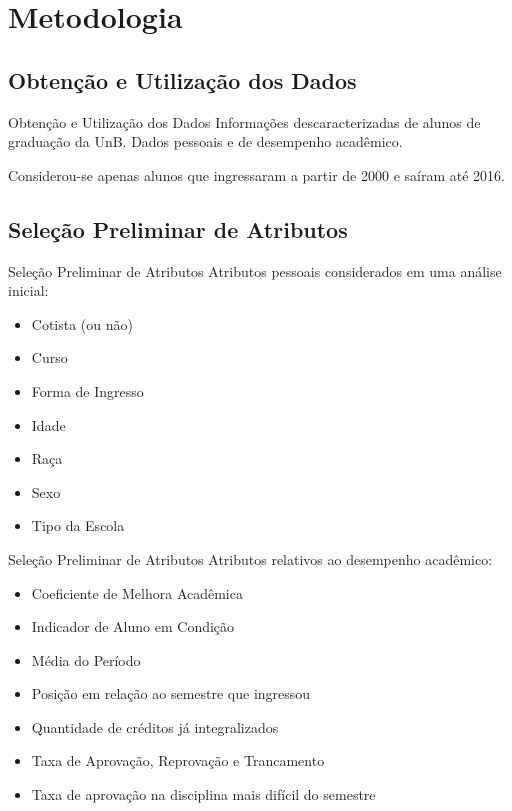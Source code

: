 \section{Metodologia} 
\subsection{Obtenção e Utilização dos Dados}
\begin{frame}{Obtenção e Utilização dos Dados}
    Informações descaracterizadas de alunos de graduação da UnB. Dados pessoais e de
    desempenho acadêmico. 

    \vspace{0.5cm}

    Considerou-se apenas alunos que ingressaram a partir de 2000 e saíram até 2016.
\end{frame}

\subsection{Seleção Preliminar de Atributos}
\begin{frame}{Seleção Preliminar de Atributos}
    Atributos pessoais considerados em uma análise inicial: 
    \begin{itemize}
        \item Cotista (ou não)
        \item Curso 
        \item Forma de Ingresso
        \item Idade
        \item Raça 
        \item Sexo 
        \item Tipo da Escola
    \end{itemize}
\end{frame}

\begin{frame}{Seleção Preliminar de Atributos}
    Atributos relativos ao desempenho acadêmico: 
    \begin{itemize}
        \item Coeficiente de Melhora Acadêmica
        \item Indicador de Aluno em Condição
        \item Média do Período
        \item Posição em relação ao semestre que ingressou
        \item Quantidade de créditos já integralizados
        \item Taxa de Aprovação, Reprovação e Trancamento
        \item Taxa de aprovação na disciplina mais difícil do semestre
    \end{itemize}
\end{frame}

